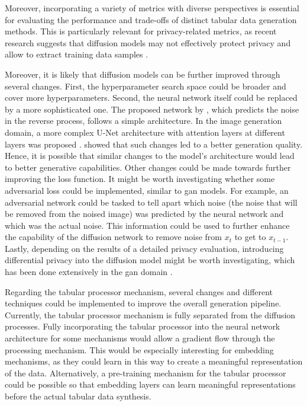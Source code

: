 Moreover, incorporating a variety of metrics with diverse perspectives is essential for evaluating the performance and trade-offs of distinct tabular data generation methods. 
This is particularly relevant for privacy-related metrics, as recent research suggests that diffusion models may not effectively protect privacy and allow to extract training data samples \cite{carlini2023ExtractingTrainingData}.

Moreover, it is likely that diffusion models can be further improved through several changes.
First, the hyperparameter search space could be broader and cover more hyperparameters.
Second, the neural network itself could be replaced by a more sophisticated one.
The proposed network by \cite{kotelnikov2022TabDDPMModellingTabular}, which predicts the noise in the reverse process, follows a simple architecture.
In the image generation domain, a more complex U-Net \cite{ronneberger2015UNetConvolutionalNetworks} architecture with attention layers at different layers was proposed \cite{dhariwal2021DiffusionModelsBeat}.
\cite{dhariwal2021DiffusionModelsBeat} showed that such changes led to a better generation quality.
Hence, it is possible that similar changes to the model's architecture would lead to better generative capabilities.
Other changes could be made towards further improving the loss function.
It might be worth investigating whether some adversarial loss could be implemented, similar to \gls{gan} models.
For example, an adversarial network could be tasked to tell apart which noise (the noise that will be removed from the noised image) was predicted by the neural network and which was the actual noise.
This information could be used to further enhance the capability of the diffusion network to remove noise from $x_{t}$ to get to $x_{t-1}$.
Lastly, depending on the results of a detailed privacy evaluation, introducing differential privacy \cite{dwork2011DifferentialPrivacy} into the diffusion model might be worth investigating, which has been done extensively in the \gls{gan} domain \cite{jordon2018PATEGANGeneratingSynthetic,9054559, kunar2021DTGANDifferentialPrivatea, torfi2022DifferentiallyPrivateSynthetic}.

Regarding the tabular processor mechanism, several changes and different techniques could be implemented to improve the overall generation pipeline.
Currently, the tabular processor mechanism is fully separated from the diffusion processes.
Fully incorporating the tabular processor into the neural network architecture for some mechanisms would allow a gradient flow through the processing mechanism.
This would be especially interesting for embedding mechanisms, as they could learn in this way to create a meaningful representation of the data.
Alternatively, a pre-training mechanism for the tabular processor could be possible so that embedding layers can learn meaningful representations before the actual tabular data synthesis.

